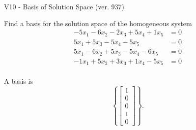 \begin{exercise}
  \begin{exerciseTitle}V10 - Basis of Solution Space (ver. 937)\end{exerciseTitle}
  \begin{exerciseStatement}
    Find a basis for the solution space of the homogeneous system 
\begin{align*}
 -5 x_ 1 -6 x_ 2 -2 x_ 3 + 5 x_ 4 + 1 x_ 5 &= 0  \\ 
  5 x_ 1 + 5 x_ 3 -5 x_ 4 -5 x_ 5 &= 0  \\ 
  5 x_ 1 -6 x_ 2 + 5 x_ 3 -5 x_ 4 -6 x_ 5 &= 0  \\ 
  -1 x_ 1 + 5 x_ 2 + 3 x_ 3 + 1 x_ 4 -5 x_ 5 &= 0  \\ 
 \end{align*}


 
  \end{exerciseStatement}

  \begin{exerciseAnswer}
   A basis is   
\[\left\{\left[\begin{array}{c}
1 \\
0 \\
0 \\
1 \\
0
\end{array}\right]\right\}.\]

  


  \end{exerciseAnswer}
\end{exercise}